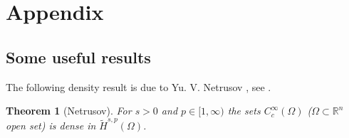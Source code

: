 \documentclass[11pt, a4paper]{article}
\newtheorem{trm}{Theorem}
\newtheorem{prop}[trm]{Proposition}
\newtheorem{rmk}[trm]{Remark}
\newcommand{\R}{\mathbb{R}}
\newcommand{\de}{\partial}
\newcommand{\luca}[1]{{\color{blue}#1}}
\begin{document}
\appendix

\section{Appendix}

\subsection{Some useful results}

The following density result is due to Yu. V. Netrusov \cite{net}, see \cite[Thm. 10.1.1]{AH} .%

\begin{trm}[Netrusov]\label{lemmadens} For $s>0$ and $p\in [1,\infty)$ the sets $C^\infty_c(\Omega)$ ($\Omega\subset\R^n$ open set) is dense in $\tilde H^{s,p}(\Omega)$.
\end{trm}







\end{document}

